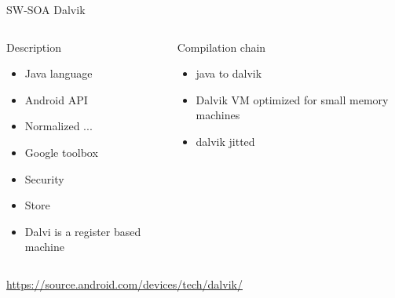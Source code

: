 %
\begin{Frame}{SW-SOA Dalvik}
  \begin{columns}[t]
    \begin{column}{\HW} %
      \begin{block}{Description}
        \begin{itemize}
        \item Java language
        \item Android API
        \item Normalized ...
        \item Google toolbox
        \item Security
        \item Store
        \item Dalvi is a register based machine
        \end{itemize}
      \end{block} 
    \end{column}
    
    \begin{column}{\HW} %
      \begin{block}{Compilation chain}
        \begin{itemize}
        \item java to dalvik
        \item Dalvik VM optimized for small memory machines
        \item dalvik jitted
        \end{itemize}
      \end{block}   
    \end{column}
  \end{columns}  
\url{https://source.android.com/devices/tech/dalvik/}
\end{Frame}


